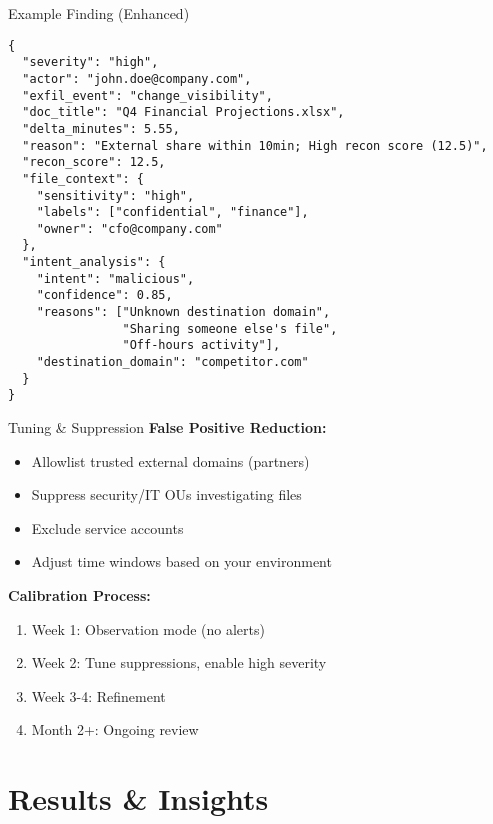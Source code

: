 \documentclass[aspectratio=169]{beamer}
\begin{document}
\begin{frame}[fragile]{Example Finding (Enhanced)}
\begin{lstlisting}[basicstyle=\ttfamily\tiny]
{
  "severity": "high",
  "actor": "john.doe@company.com",
  "exfil_event": "change_visibility",
  "doc_title": "Q4 Financial Projections.xlsx",
  "delta_minutes": 5.55,
  "reason": "External share within 10min; High recon score (12.5)",
  "recon_score": 12.5,
  "file_context": {
    "sensitivity": "high",
    "labels": ["confidential", "finance"],
    "owner": "cfo@company.com"
  },
  "intent_analysis": {
    "intent": "malicious",
    "confidence": 0.85,
    "reasons": ["Unknown destination domain",
                "Sharing someone else's file",
                "Off-hours activity"],
    "destination_domain": "competitor.com"
  }
}
\end{lstlisting}
\end{frame}

\begin{frame}{Tuning \& Suppression}
\textbf{False Positive Reduction:}
\begin{itemize}
    \item Allowlist trusted external domains (partners)
    \item Suppress security/IT OUs investigating files
    \item Exclude service accounts
    \item Adjust time windows based on your environment
\end{itemize}

\vspace{1em}

\textbf{Calibration Process:}
\begin{enumerate}
    \item Week 1: Observation mode (no alerts)
    \item Week 2: Tune suppressions, enable high severity
    \item Week 3-4: Refinement
    \item Month 2+: Ongoing review
\end{enumerate}
\end{frame}

\section{Results \& Insights}
\end{document}
